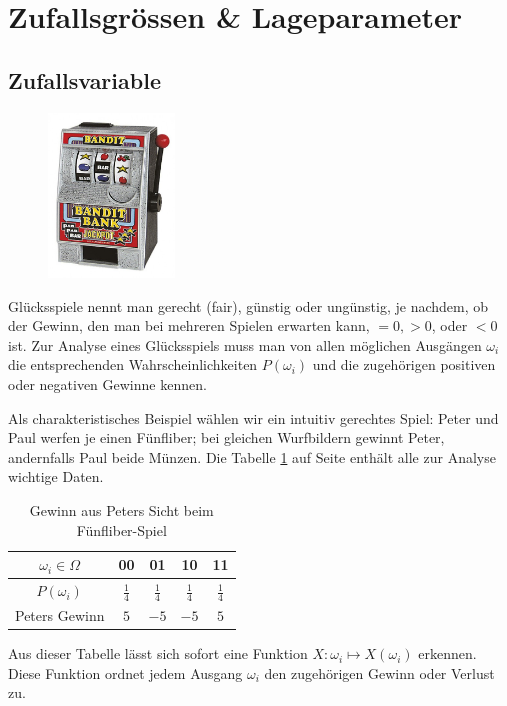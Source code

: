 \documentclass[%
11pt,%
twoside,%
titlepage,%
german,%
headsepline%
]{scrartcl}
\newcommand{\spaltenheight}{\rule{0mm}{3ex}}
\newcommand{\spaltensep}{\\[1ex]}
\begin{document}
\clearpage

\section{Zufallsgrössen \& Lageparameter}

\subsection{Zufallsvariable}
\begin{figure}
  \begin{center}
    \includegraphics[width=0.3\textwidth]{pictures/bandit}
  \end{center}
\end{figure}
Glücksspiele nennt man gerecht (fair), günstig oder ungünstig, je nachdem, ob der Gewinn, den man bei mehreren Spielen erwarten kann, $=0, >0$, oder $<0$ ist. Zur Analyse eines Glücksspiels muss man von allen möglichen Ausgängen $\omega_i$ die entsprechenden Wahrscheinlichkeiten $P(\omega_i)$ und die zugehörigen positiven oder negativen Gewinne kennen.

\begin{bsp}
Als charakteristisches Beispiel wählen wir ein intuitiv gerechtes Spiel: Peter und Paul werfen je einen Fünfliber; bei gleichen Wurfbildern gewinnt Peter, andernfalls Paul beide Münzen.
Die Tabelle \ref{tab:5liber} auf Seite \pageref{tab:5liber} enthält alle zur Analyse wichtige Daten.

\begin{table}
\begin{center}
\begin{tabular}{|c|c|c|c|c|}
\hline
\rowcolor{Gray}\spaltenheight $\omega_i\in\Omega$ & 00 & 01 & 10 & 11\spaltensep \hline
\rowcolor{lightyellow}\spaltenheight $P(\omega_i)$ & $\frac{1}{4}$ & $\frac{1}{4}$ & $\frac{1}{4}$ & $\frac{1}{4}$\spaltensep \hline
\rowcolor{Gray}\spaltenheight Peters Gewinn & $5$ & $-5$ & $-5$ & $5$\spaltensep \hline
\end{tabular}
\end{center}
\caption{Gewinn aus Peters Sicht beim Fünfliber-Spiel}\label{tab:5liber}
\end{table}
\end{bsp}
Aus dieser Tabelle lässt sich sofort eine Funktion $X:\omega_i\mapsto X(\omega_i)$
erkennen. Diese Funktion ordnet jedem Ausgang $\omega_i$ den zugehörigen Gewinn oder Verlust zu.
\end{document}
